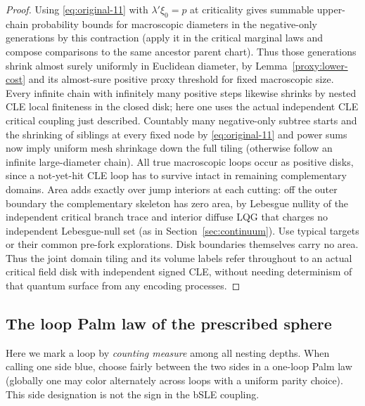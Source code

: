 \begin{proof}
Using \eqref{eq:original-11} with \(\lambda'\xi_0=p\) at criticality gives summable upper-chain probability bounds for macroscopic diameters in the negative-only generations by this contraction (apply it in the critical marginal laws and compose comparisons to the same ancestor parent chart).
Thus those generations shrink almost surely uniformly in Euclidean diameter, by Lemma~\ref{proxy:lower-cost} and its almost-sure positive proxy threshold for fixed macroscopic size.
Every infinite chain with infinitely many positive steps likewise shrinks by nested CLE local finiteness in the closed disk; here one uses the actual independent CLE critical coupling just described.
Countably many negative-only subtree starts and the shrinking of siblings at every fixed node by \eqref{eq:original-11} and power sums now imply uniform mesh shrinkage down the full tiling (otherwise follow an infinite large-diameter chain).
All true macroscopic loops occur as positive disks, since a not-yet-hit CLE loop has to survive intact in remaining complementary domains.
Area adds exactly over jump interiors at each cutting: off the outer boundary the complementary skeleton has zero area, by Lebesgue nullity of the independent critical branch trace and interior diffuse LQG that charges no independent Lebesgue-null set (as in Section~\ref{sec:continuum}).
Use typical targets or their common pre-fork explorations.
Disk boundaries themselves carry no area.
Thus the joint domain tiling and its volume labels refer throughout to an actual critical field disk with independent signed CLE, without needing determinism of that quantum surface from any encoding processes.

\end{proof}

\subsection{The loop Palm law of the prescribed sphere}\label{cut:palm-section}

Here we mark a loop by \emph{counting measure} among all nesting depths. When calling one side blue, choose fairly between the two sides in a one-loop Palm law (globally one may color alternately across loops with a uniform parity choice). This side designation is not the sign in the bSLE coupling.

